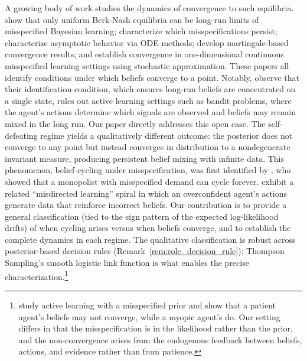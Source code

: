 \documentclass[12pt]{article}
\begin{document}
A growing body of work studies the dynamics of convergence to such equilibria. \citet{fudenbergLimitPointsEndogenous2021a} show that only uniform Berk-Nash equilibria can be long-run limits of misspecified Bayesian learning; \citet{fudenbergWhichMisspecificationsPersist2023a} characterize which misspecifications persist; \citet{espondaAsymptoticBehaviorBayesian2021a} characterize asymptotic behavior via ODE methods; \citet{frickBeliefConvergenceMisspecified2023} develop martingale-based convergence results; and \citet{heidhuesConvergenceMisspecifiedLearning2021} establish convergence in one-dimensional continuous misspecified learning settings using stochastic approximation. These papers all identify conditions under which beliefs converge to a point. Notably, \citet{frickBeliefConvergenceMisspecified2023} observe that their identification condition, which ensures long-run beliefs are concentrated on a single state, rules out active learning settings such as bandit problems, where the agent's actions determine which signals are observed and beliefs may remain mixed in the long run. Our paper directly addresses this open case. The self-defeating regime yields a qualitatively different outcome: the posterior does not converge to any point but instead converges in distribution to a nondegenerate invariant measure, producing persistent belief mixing with infinite data. This phenomenon, belief cycling under misspecification, was first identified by \citet{nyarkoLearningMisspecifiedModels1991}, who showed that a monopolist with misspecified demand can cycle forever. \citet{heidhuesUnrealisticExpectationsMisguided2018} exhibit a related ``misdirected learning'' spiral in which an overconfident agent's actions generate data that reinforce incorrect beliefs. Our contribution is to provide a general classification (tied to the sign pattern of the expected log-likelihood drifts) of when cycling arises versus when beliefs converge, and to establish the complete dynamics in each regime. The qualitative classification is robust across posterior-based decision rules (Remark~\ref{rem:role_decision_rule}); Thompson Sampling's smooth logistic link function is what enables the precise characterization.\footnote{%
\citet{fudenbergActivelearningMisspecifiedPrior2017} study active learning with a misspecified prior and show that a patient agent's beliefs may not converge, while a myopic agent's do. Our setting differs in that the misspecification is in the likelihood rather than the prior, and the non-convergence arises from the endogenous feedback between beliefs, actions, and evidence rather than from patience.}
\end{document}
